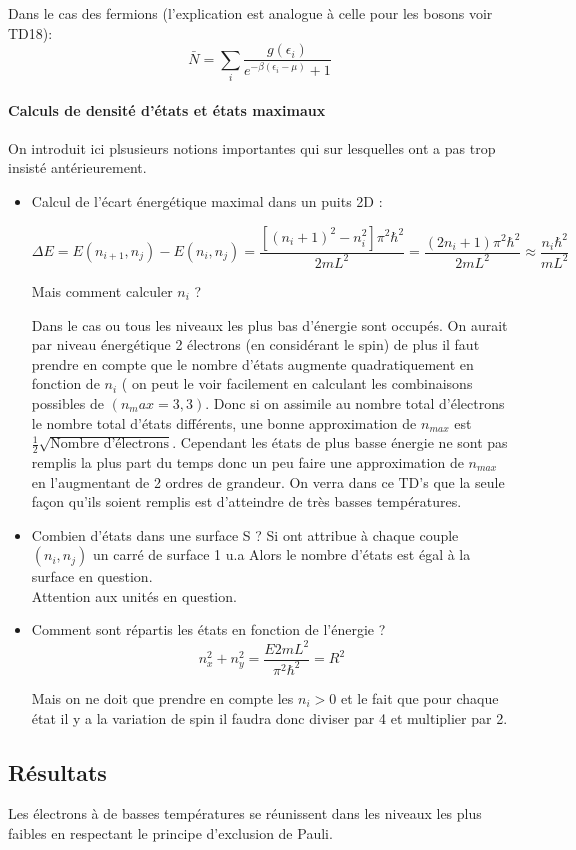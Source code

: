 Dans le cas des fermions (l'explication est analogue à celle pour les bosons voir TD18):
\[
	\bar{N}=\sum_i \frac{g(\epsilon_i)}{e^{-\beta (\epsilon_i-\mu)}+1}
\]


\paragraph{Calculs de densité d'états et états maximaux}

On introduit ici plsusieurs notions importantes qui sur lesquelles ont a pas trop insisté antérieurement.

\begin{itemize}[label=]

	\item Calcul de l'écart énergétique maximal dans un puits 2D : 

	\[
		\Delta E= E(n_{i+1},n_{j})-E(n_{i},n_{j})=\frac{[(n_i+1)^2-n_i^2  ]\pi^2\hbar^2}{2mL^2}= \frac{(2n_i+1) \pi^2 \hbar^2}{2mL^2}\approx \frac{n_i \hbar^2}{mL^2} 
	\]

	Mais comment calculer $n_i$ ? 

	Dans le cas ou tous les niveaux les plus bas d'énergie sont occupés. On aurait par niveau énergétique 2 électrons (en considérant le spin) de plus il faut prendre en compte que le nombre d'états augmente quadratiquement en fonction de $n_i$ ( on peut le voir facilement en calculant les combinaisons possibles de $(n_max=3,3)$. Donc si on assimile au nombre total d'électrons le nombre total d'états différents, une bonne approximation de $n_{max}$ est $\frac{1}{2}\sqrt{\text{Nombre d'électrons}}$. Cependant les états de plus basse énergie ne sont pas remplis la plus part du temps donc un peu faire une approximation de $n_{max}$ en l'augmentant de 2 ordres de grandeur. On verra dans ce TD's que la seule façon qu'ils soient remplis est d'atteindre de très basses températures.


	\item Combien d'états dans une surface S ?
	Si ont attribue à chaque couple $(n_i,n_j)$ un carré de surface 1 u.a Alors le nombre d'états est égal à la surface en question.\\
	Attention aux unités en question.

	\item Comment sont répartis les états en fonction de l'énergie ?
	\[
		n_x^2+n_y^2=\frac{E2mL^2}{\pi^2 \hbar^2}=R^2
	\]

	Mais on ne doit que prendre en compte les $n_i>0$ et le fait que pour chaque état il y a la variation de spin il faudra donc diviser par 4 et multiplier par 2.

\end{itemize} 

\subsection{Résultats}

Les électrons à de basses températures se réunissent dans les niveaux les plus faibles en respectant le principe d'exclusion de Pauli.
